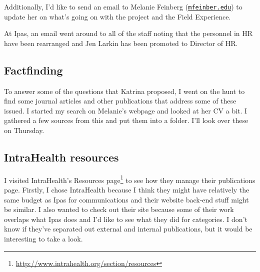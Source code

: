 \documentclass{article}
\begin{document}
Additionally, I'd like to send an email to Melanie Feinberg (\texttt{\href{mailto:mfeinber\@unc.edu}{mfeinber\@unc.edu}}) to update her on what's going on with the project and the Field Experience.

At Ipas, an email went around to all of the staff noting that the personnel in HR have been rearranged and Jen Larkin has been promoted to Director of HR.

\subsection{Factfinding}
To answer some of the questions that Katrina proposed, I went on the hunt to find some journal articles and other publications that address some of these issued. I started my search on Melanie's webpage and looked at her CV a bit. I gathered a few sources from this and put them into a folder. I'll look over these on Thursday.

\subsection{IntraHealth resources}
I visited IntraHealth's Resources page\footnote{\url{http://www.intrahealth.org/section/resources}} to see how they manage their publications page. Firstly, I chose IntraHealth because I think they might have relatively the same budget as Ipas for communications and their website back-end stuff might be similar. I also wanted to check out their site because some of their work overlaps what Ipas does and I'd like to see what they did for categories. I don't know if they've separated out external and internal publications, but it would be interesting to take a look.
\end{document}
